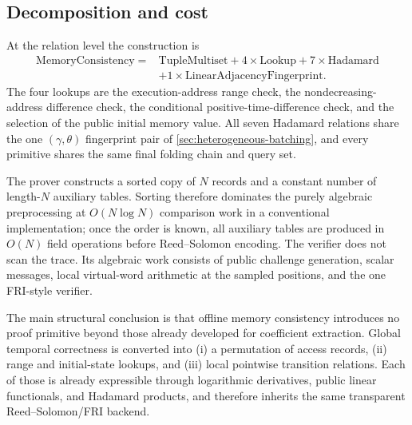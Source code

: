 \subsection{Decomposition and cost}
\label{sec:memory-cost}

At the relation level the construction is
\begin{equation}
\boxed{
\begin{aligned}
  \mathrm{MemoryConsistency}
  ={}&\mathrm{TupleMultiset}
  +4\times\mathrm{Lookup}
  +7\times\mathrm{Hadamard}\\
  &+1\times\mathrm{LinearAdjacencyFingerprint}.
\end{aligned}}
\label{eq:memory-decomposition-box}
\end{equation}
The four lookups are the execution-address range check, the nondecreasing-address difference check, the conditional positive-time-difference check, and the selection of the public initial memory value.  All seven Hadamard relations share the one $(\gamma,\theta)$ fingerprint pair of \cref{sec:heterogeneous-batching}, and every primitive shares the same final folding chain and query set.

The prover constructs a sorted copy of $N$ records and a constant number of length-$N$ auxiliary tables.  Sorting therefore dominates the purely algebraic preprocessing at $O(N\log N)$ comparison work in a conventional implementation; once the order is known, all auxiliary tables are produced in $O(N)$ field operations before Reed--Solomon encoding.  The verifier does not scan the trace.  Its algebraic work consists of public challenge generation, scalar messages, local virtual-word arithmetic at the sampled positions, and the one FRI-style verifier.

The main structural conclusion is that offline memory consistency introduces no proof primitive beyond those already developed for coefficient extraction.  Global temporal correctness is converted into (i) a permutation of access records, (ii) range and initial-state lookups, and (iii) local pointwise transition relations.  Each of those is already expressible through logarithmic derivatives, public linear functionals, and Hadamard products, and therefore inherits the same transparent Reed--Solomon/FRI backend.
